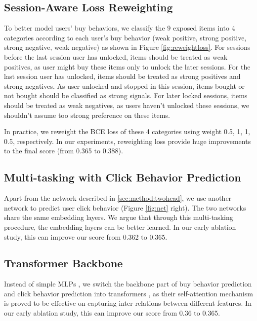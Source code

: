\subsection{Session-Aware Loss Reweighting}


To better model users' buy behaviors, we classify the 9 exposed items into 4 categories according to each user's buy behavior (weak positive, strong positive, strong negative, weak negative) as shown in Figure \ref{fig:reweightloss}.
%
For sessions before the last session user has unlocked, items should be treated as weak positives, as user might buy these items only to unlock the later sessions.
%
For the last session user has unlocked, items should be treated as strong positives and strong negatives. As user unlocked and stopped in this session, items bought or not bought should be classified as strong signals.
%
For later locked sessions, items should be treated as weak negatives, as users haven't unlocked these sessions, we shouldn't assume too strong preference on these items.

In practice, we reweight the BCE loss of these 4 categories using weight 0.5, 1, 1, 0.5, respectively.
In our experiments, reweighting loss provide huge improvements to the final score (from 0.365 to 0.388).


\subsection{Multi-tasking with Click Behavior Prediction}
Apart from the network described in \ref{sec:method:twohead}, we use another network to predict user click behavior (Figure \ref{fig:net} right).
The two networks share the same embedding layers.
We argue that through this multi-tasking procedure, the embedding layers can be better learned.
%
In our early ablation study, this can improve our score from 0.362 to 0.365.


\subsection{Transformer Backbone}
Instead of simple MLPs \cite{din, ncf}, we switch the backbone part of buy behavior prediction and click behavior prediction into transformers \cite{transformer}, as their self-attention mechanism is proved to be effective on capturing inter-relations between different features.
%
In our early ablation study, this can improve our score from 0.36 to 0.365.




